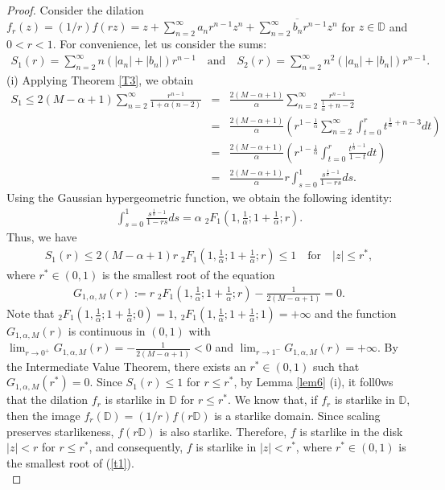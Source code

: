 \documentclass[11pt,reqno]{amsart}
\newtheorem{open problem}{Open problem}[section]
\newcommand{\ol}{\overline}
\newcommand{\beas}{\begin{eqnarray*}}
\newcommand{\eeas}{\end{eqnarray*}}
\newcommand{\bea}{\begin{eqnarray}}
\newcommand{\eea}{\end{eqnarray}}
\numberwithin{equation}{section}
\begin{document}
\begin{proof} Consider the dilation $f_r(z)=(1/r)f(rz)=z+\sum_{n=2}^{\infty} a_nr^{n-1}z^n+\ol{\sum_{n=2}^{\infty} b_nr^{n-1}z^n}$ for 
$z\in\mathbb{D}$ and $0<r<1$.
For convenience, let us consider the sums:
\beas S_1(r)=\sum_{n=2}^{\infty} n\left(|a_n|+|b_n|\right)r^{n-1}\quad\text{and}\quad S_2(r)=\sum_{n=2}^{\infty} n^2\left(|a_n|+|b_n|\right)r^{n-1}.\eeas
(i) Applying \textrm{Theorem \ref{T3}}, we obtain
\beas S_1\leq 2(M-\alpha+1)\sum_{n=2}^{\infty}\frac{r^{n-1}}{1+\alpha (n-2)}&=&\frac{2(M-\alpha+1)}{\alpha}\sum_{n=2}^{\infty}\frac{r^{n-1}}{\frac{1}{\alpha}+n-2}\\[2mm]
&=&\frac{2(M-\alpha+1)}{\alpha}\left(r^{1-\frac{1}{\alpha}}\sum_{n=2}^{\infty}\int_{t=0}^r t^{\frac{1}{\alpha}+n-3}dt\right)\\[1.5mm]
&=&\frac{2(M-\alpha+1)}{\alpha}\left(r^{1-\frac{1}{\alpha}}\int_{t=0}^r \frac{t^{\frac{1}{\alpha}-1}}{1-t}dt\right)\\
&=&\frac{2(M-\alpha+1)}{\alpha}r\int_{s=0}^1 \frac{s^{\frac{1}{\alpha}-1}}{1-rs}ds.\eeas
Using the Gaussian hypergeometric function, we obtain the following identity:
\bea \label{tt1}\int_{s=0}^1 \frac{s^{\frac{1}{\alpha}-1}}{1-rs}ds=\alpha\;{}_2F_1\left(1,\frac{1}{\alpha};1+\frac{1}{\alpha}; r\right).\eea
Thus, we have
\beas S_1(r)\leq 2(M-\alpha+1)r\;{}_2F_1\left(1,\frac{1}{\alpha};1+\frac{1}{\alpha}; r\right)\leq1\quad\text{for}\quad |z|\leq r^*,\eeas
where $r^*\in(0,1)$ is the smallest root of the equation 
\bea\label{t1} G_{1,\alpha,M}(r):=r\;{}_2F_1\left(1,\frac{1}{\alpha};1+\frac{1}{\alpha}; r\right)-\frac{1}{2(M-\alpha+1)}=0.\eea
Note that ${}_2F_1\left(1,\frac{1}{\alpha};1+\frac{1}{\alpha}; 0\right)=1$, ${}_2F_1\left(1,\frac{1}{\alpha};1+\frac{1}{\alpha}; 1\right)=+\infty$ and the function 
$G_{1,\alpha,M}(r)$ is continuous in $(0,1)$ with $\lim_{r\to 0^+} G_{1,\alpha,M}(r)=-\frac{1}{2(M-\alpha+1)}<0$ and $\lim_{r\to1^-}G_{1,\alpha,M}(r)=+\infty$. By the 
Intermediate Value Theorem, there exists an $r^*\in(0,1)$ such that $G_{1,\alpha,M}(r^*)=0$. Since $S_1(r) \leq 1$ for $r \leq r^*$, by \textrm{Lemma \ref{lem6}} (i), it foll0ws that the dilation $f_r$ is starlike in $\mathbb{D}$ for $r \leq r^*$. 
We know that, if $f_r$ is starlike in $\mathbb{D}$, then the image $f_r(\mathbb{D}) = (1/r)f(r\mathbb{D})$ is a starlike domain. Since scaling preserves starlikeness, $f(r\mathbb{D})$ 
is also starlike. Therefore, $f$ is starlike in the disk $|z|< r$ for $r \leq r^*$, and consequently, $f$ is starlike in $|z| < r^*$, where $r^*\in(0,1)$ is the smallest root of (\ref{t1}).\\[2mm]

\end{proof}
\end{document}

